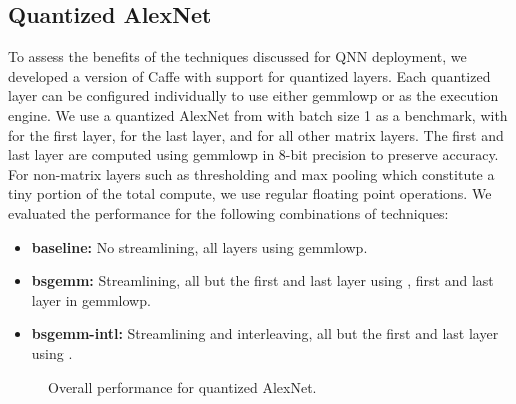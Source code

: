 \documentclass[sigconf]{acmart}
\begin{document}
\subsection{Quantized AlexNet}
To assess the benefits of the techniques discussed for QNN deployment, we developed a version of Caffe with support for quantized layers.
Each quantized layer can be configured individually to use either gemmlowp or \ours{} as the execution engine.
We use a quantized \qnn AlexNet from \cite{hwgq} with batch size 1 as a benchmark, with  for the first layer,  for the last layer, and  for all other matrix layers.
The first and last layer are computed using gemmlowp in 8-bit precision to preserve accuracy.
For non-matrix layers such as thresholding and max pooling which constitute a tiny portion of the total compute, we use regular floating point operations.
We evaluated the performance for the following combinations of techniques:

\begin{itemize}
	\item \textbf{baseline:} No streamlining, all layers using gemmlowp.
	\item \textbf{bsgemm:} Streamlining, all but the first and last layer using \ours{}, first and last layer in gemmlowp.
	\item \textbf{bsgemm-intl:} Streamlining and interleaving, all but the first and last layer using \ours{} .
\end{itemize}

\begin{figure}
	\footnotesize
	\caption{Overall performance for quantized AlexNet.}
	\label{fig:breakdown}
\end{figure}
\end{document}

